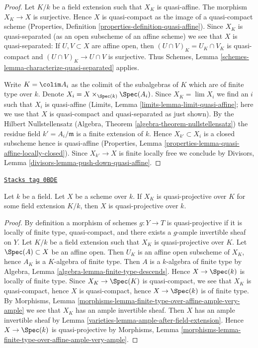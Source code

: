 \begin{proof}
Let $K/k$ be a field extension such that $X_K$ is quasi-affine.
The morphism $X_K \to X$ is surjective. Hence $X$ is quasi-compact
as the image of a quasi-compact scheme (Properties, Definition
\ref{properties-definition-quasi-affine}). Since $X_K$ is quasi-separated
(as an open subscheme of an affine scheme)
we see that $X$ is quasi-separated: If $U, V \subset X$ are
affine open, then $(U \cap V)_K = U_K \cap V_K$ is quasi-compact
and $(U \cap V)_K \to U \cap V$ is surjective. Thus
Schemes, Lemma \ref{schemes-lemma-characterize-quasi-separated} applies.

\medskip\noindent
Write $K = \colim A_i$ as the colimit of the subalgebras of $K$
which are of finite type over $k$. Denote
$X_i = X \times_{\Spec(k)} \Spec(A_i)$.
Since $X_K = \lim X_i$ we find an $i$ such that $X_i$ is quasi-affine
(Limits, Lemma \ref{limits-lemma-limit-quasi-affine};
here we use that $X$ is quasi-compact and quasi-separated as
just shown). By the Hilbert Nullstellensatz
(Algebra, Theorem \ref{algebra-theorem-nullstellensatz})
the residue field $k' = A_i/\mathfrak m$ is a finite
extension of $k$. Hence $X_{k'} \subset X_i$ is a closed
subscheme hence is quasi-affine (Properties, Lemma
\ref{properties-lemma-quasi-affine-locally-closed}).
Since $X_{k'} \to X$ is finite locally free we conclude by
Divisors, Lemma \ref{divisors-lemma-push-down-quasi-affine}.
\end{proof}

\begin{lemma}
\label{varieties-lemma-quasi-projective-after-field-extension}
\href{https://stacks.math.columbia.edu/tag/0BDE}{\texttt{Stacks tag 0BDE}}

Let $k$ be a field. Let $X$ be a scheme over $k$. If $X_K$ is quasi-projective
over $K$ for some field extension $K/k$, then $X$ is quasi-projective
over $k$.
\end{lemma}

\begin{proof}

By definition a morphism of schemes $g : Y \to T$ is quasi-projective
if it is locally of finite type, quasi-compact, and there exists
a $g$-ample invertible sheaf on $Y$.
Let $K/k$ be a field extension such that $X_K$ is quasi-projective
over $K$. Let $\Spec(A) \subset X$ be an affine open. Then $U_K$ is an
affine open subscheme of $X_K$, hence $A_K$ is a $K$-algebra of finite type.
Then $A$ is a $k$-algebra of finite type by
Algebra, Lemma \ref{algebra-lemma-finite-type-descends}.
Hence $X \to \Spec(k)$ is locally of finite type.
Since $X_K \to \Spec(K)$ is quasi-compact, we see that $X_K$ is
quasi-compact, hence $X$ is quasi-compact, hence $X \to \Spec(k)$
is of finite type. By Morphisms, Lemma
\ref{morphisms-lemma-finite-type-over-affine-ample-very-ample}
we see that $X_K$ has an ample invertible sheaf.
Then $X$ has an ample invertible sheaf by
Lemma \ref{varieties-lemma-ample-after-field-extension}.
Hence $X \to \Spec(k)$ is quasi-projective by Morphisms, Lemma
\ref{morphisms-lemma-finite-type-over-affine-ample-very-ample}.
\end{proof}

